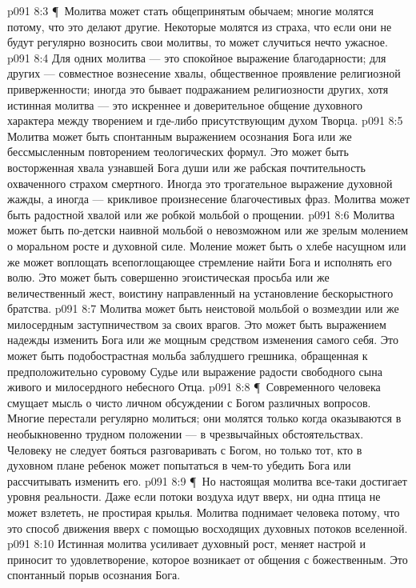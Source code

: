 \vs p091 8:3 \P\ Молитва может стать общепринятым обычаем; многие молятся потому, что это делают другие. Некоторые молятся из страха, что если они не будут регулярно возносить свои молитвы, то может случиться нечто ужасное.
\vs p091 8:4 Для одних молитва --- это спокойное выражение благодарности; для других --- совместное вознесение хвалы, общественное проявление религиозной приверженности; иногда это бывает подражанием религиозности других, хотя истинная молитва --- это искреннее и доверительное общение духовного характера между творением и где\hyp{}либо присутствующим духом Творца.
\vs p091 8:5 Молитва может быть спонтанным выражением осознания Бога или же бессмысленным повторением теологических формул. Это может быть восторженная хвала узнавшей Бога души или же рабская почтительность охваченного страхом смертного. Иногда это трогательное выражение духовной жажды, а иногда --- крикливое произнесение благочестивых фраз. Молитва может быть радостной хвалой или же робкой мольбой о прощении.
\vs p091 8:6 Молитва может быть по\hyp{}детски наивной мольбой о невозможном или же зрелым молением о моральном росте и духовной силе. Моление может быть о хлебе насущном или же может воплощать всепоглощающее стремление найти Бога и исполнять его волю. Это может быть совершенно эгоистическая просьба или же величественный жест, воистину направленный на установление бескорыстного братства.
\vs p091 8:7 Молитва может быть неистовой мольбой о возмездии или же милосердным заступничеством за своих врагов. Это может быть выражением надежды изменить Бога или же мощным средством изменения самого себя. Это может быть подобострастная мольба заблудшего грешника, обращенная к предположительно суровому Судье или выражение радости свободного сына живого и милосердного небесного Отца.
\vs p091 8:8 \P\ Современного человека смущает мысль о чисто личном обсуждении с Богом различных вопросов. Многие перестали регулярно молиться; они молятся только когда оказываются в необыкновенно трудном положении --- в чрезвычайных обстоятельствах. Человеку не следует бояться разговаривать с Богом, но только тот, кто в духовном плане ребенок может попытаться в чем\hyp{}то убедить Бога или рассчитывать изменить его.
\vs p091 8:9 \P\ Но настоящая молитва все\hyp{}таки достигает уровня реальности. Даже если потоки воздуха идут вверх, ни одна птица не может взлететь, не простирая крылья. Молитва поднимает человека потому, что это способ движения вверх с помощью восходящих духовных потоков вселенной.
\vs p091 8:10 Истинная молитва усиливает духовный рост, меняет настрой и приносит то удовлетворение, которое возникает от общения с божественным. Это спонтанный порыв осознания Бога.
